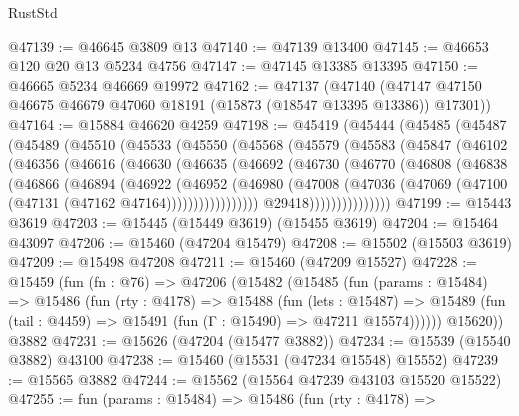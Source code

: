\begin{lexlean}{RustStd}
\begin{coremodule}
@47139 := @46645 @3809 @13
@47140 := @47139 @13400
@47145 := @46653 @120 @20 @13 @5234 @4756
@47147 := @47145 @13385 @13395
@47150 := @46665 @5234 @46669 @19972
@47162 := @47137
    (@47140 (@47147 @47150 @46675 @46679 @47060 @18191 (@15873 (@18547 @13395 @13386)) @17301))
@47164 := @15884 @46620 @4259
@47198 := @45419
    (@45444
      (@45485
        (@45487
          (@45489
            (@45510
              (@45533
                (@45550
                  (@45568
                    (@45579
                      (@45583
                        (@45847
                          (@46102
                            (@46356
                              (@46616
                                (@46630
                                  (@46635
                                    (@46692
                                      (@46730
                                        (@46770
                                          (@46808
                                            (@46838
                                              (@46866
                                                (@46894
                                                  (@46922
                                                    (@46952
                                                      (@46980
                                                        (@47008
                                                          (@47036
                                                            (@47069
                                                              (@47100
                                                                (@47131
                                                                  (@47162 @47164)))))))))))))))))
                                  @29418)))))))))))))))
@47199 := @15443 @3619
@47203 := @15445 (@15449 @3619) (@15455 @3619)
@47204 := @15464 @43097
@47206 := @15460 (@47204 @15479)
@47208 := @15502 (@15503 @3619)
@47209 := @15498 @47208
@47211 := @15460 (@47209 @15527)
@47228 := @15459
    (fun (fn : @76) =>
    @47206
      (@15482
        (@15485
          (fun (params : @15484) =>
          @15486
            (fun (rty : @4178) =>
            @15488
              (fun (lets : @15487) =>
              @15489 (fun (tail : @4459) => @15491 (fun (Γ : @15490) => @47211 @15574))))))
        @15620))
    @3882
@47231 := @15626 (@47204 (@15477 @3882))
@47234 := @15539 (@15540 @3882) @43100
@47238 := @15460 (@15531 (@47234 @15548) @15552)
@47239 := @15565 @3882
@47244 := @15562 (@15564 @47239 @43103 @15520 @15522)
@47255 := fun (params : @15484) =>
  @15486
    (fun (rty : @4178) =>

\end{coremodule}
\end{lexlean}

